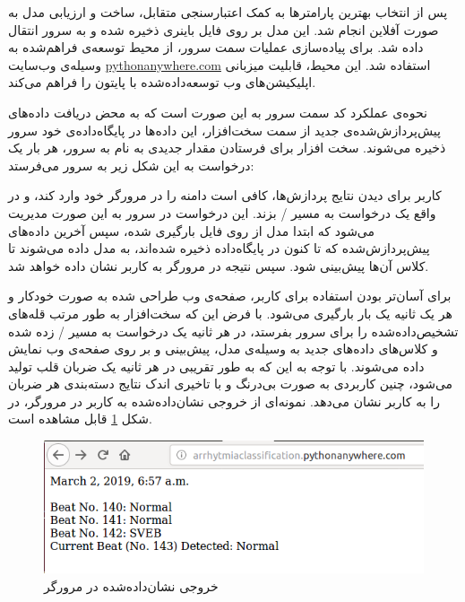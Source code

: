  پس از انتخاب بهترین پارامترها به کمک اعتبارسنجی متقابل، ساخت و ارزیابی مدل به صورت آفلاین انجام شد. این مدل بر روی فایل باینری ذخیره شده و به سرور انتقال داده شد. برای پیاده‌سازی عملیات سمت سرور، از محیط توسعه‌ی فراهم‌شده به وسیله‌ی وب‌سایت \url{pythonanywhere.com} استفاده شد. این محیط، قابلیت میزبانی اپلیکیشن‌های وب توسعه‌داده‌شده با پایتون را فراهم می‌کند.
 
 نحوه‌ی عملکرد کد سمت سرور به این صورت است که به محض دریافت داده‌‌های پیش‌پردازش‌شده‌ی جدید از سمت سخت‌افزار، این داده‌ها در پایگاه‌داده‌ی خود سرور ذخیره می‌شوند. سخت افزار برای فرستادن مقدار جدیدی به نام  به سرور، هر بار یک درخواست  به این شکل زیر به سرور می‌فرستد:
 
کاربر برای دیدن نتایج پردازش‌ها، کافی است  دامنه را در مرورگر خود وارد کند، و در واقع یک درخواست  به مسیر / بزند. این درخواست در سرور به این صورت مدیریت می‌شود که ابتدا مدل  از روی فایل بارگیری شده، سپس آخرین داده‌‌های پیش‌پردازش‌شده که تا کنون در پایگاه‌داده ذخیره شده‌اند، به مدل داده می‌شوند تا کلاس آن‌ها پیش‌بینی شود. سپس نتیجه در مرورگر به کاربر نشان داده خواهد شد. 
 
برای آسان‌تر بودن استفاده برای کاربر، صفحه‌ی وب طراحی شده به صورت خودکار و هر یک ثانیه یک بار بارگیری می‌شود. با فرض این که سخت‌افزار به طور مرتب قله‌های  تشخیص‌داده‌شده را برای سرور بفرستد، در هر ثانیه یک درخواست  به مسیر / زده شده و کلاس‌های داده‌های جدید به وسیله‌ی مدل، پیش‌بینی و بر روی صفحه‌ی وب نمایش داده می‌شوند. با توجه به این که به طور تقریبی در هر ثانیه یک ضربان قلب تولید می‌شود، چنین کاربردی به صورت بی‌درنگ و با تاخیری اندک نتایج دسته‌بندی هر ضربان را به کاربر نشان می‌دهد. نمونه‌ای از خروجی نشان‌داده‌شده به کاربر در مرورگر، در شکل \ref{fig:website} قابل مشاهده است.

\begin{figure}[!htb]
\centering
\includegraphics[width=15cm]{Figures/website.png}
\caption{خروجی نشان‌داده‌شده در مرورگر}
\label{fig:website}
\end{figure}	

